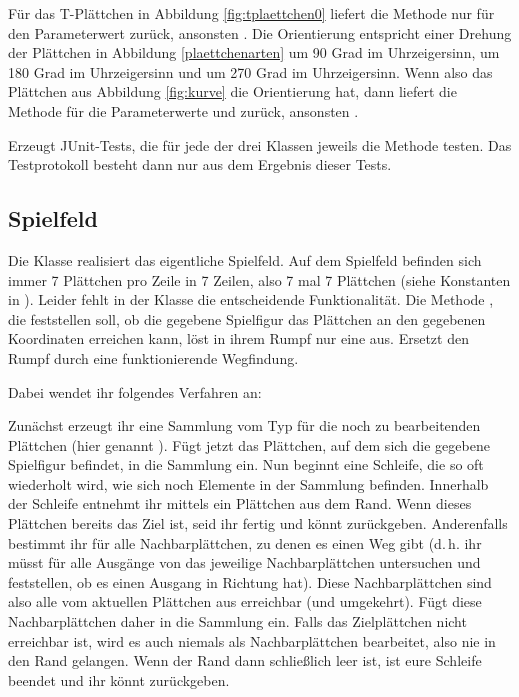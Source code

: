 \documentclass{pi-aufgabenblatt}
\newcommand{\dH}{\mbox{d.\,h.}\xspace}
\begin{document}
Für das T-Plättchen in Abbildung \ref{fig:tplaettchen0} liefert die Methode  
nur für den Parameterwert   zurück, ansonsten . Die Orientierung
 entspricht einer Drehung der Plättchen in Abbildung \ref{plaettchenarten} um 90 Grad im 
Uhrzeigersinn,  um 180 Grad im Uhrzeigersinn und  um 270 Grad im 
Uhrzeigersinn. Wenn also das Plättchen  aus Abbildung \ref{fig:kurve} die Orientierung  
hat, dann liefert die Methode  für die Parameterwerte   
und   zurück, ansonsten .

Erzeugt JUnit-Tests, die für jede der drei Klassen jeweils die Methode  testen. Das Testprotokoll 
besteht dann nur aus dem Ergebnis dieser Tests.

\subsection{Spielfeld }
Die Klasse  realisiert das eigentliche Spielfeld. Auf dem Spielfeld befinden sich immer 7 Plättchen pro Zeile in 7 Zeilen,
also 7 mal 7 Plättchen (siehe Konstanten in ). Leider fehlt in der Klasse die entscheidende Funktionalität.
Die Methode , die feststellen soll,
ob die gegebene Spielfigur das Plättchen an den gegebenen Koordinaten erreichen kann, löst in ihrem Rumpf nur eine 
 aus. Ersetzt den Rumpf durch eine funktionierende Wegfindung.

Dabei wendet ihr folgendes Verfahren an:

Zunächst erzeugt ihr eine Sammlung vom Typ  für die noch zu bearbeitenden Plättchen (hier genannt ). 
Fügt jetzt das Plättchen, auf dem sich die gegebene Spielfigur befindet, in die Sammlung  ein. Nun beginnt eine 
Schleife, die so oft wiederholt wird, wie sich noch Elemente in der Sammlung  befinden. Innerhalb der Schleife entnehmt ihr 
mittels  ein Plättchen  aus dem Rand.  Wenn dieses Plättchen bereits das Ziel ist, seid ihr fertig und könnt  zurückgeben.
Anderenfalls bestimmt ihr für  alle Nachbarplättchen, zu denen es einen Weg gibt (\dH ihr müsst für alle Ausgänge von  das jeweilige
Nachbarplättchen untersuchen und feststellen, ob es einen Ausgang in Richtung  hat). Diese Nachbarplättchen sind also alle vom aktuellen
Plättchen aus erreichbar (und umgekehrt). Fügt diese Nachbarplättchen daher in die Sammlung  ein. Falls das Zielplättchen nicht 
erreichbar ist, wird es auch niemals als Nachbarplättchen bearbeitet, also nie in den Rand gelangen.  Wenn der Rand dann schließlich leer ist, 
ist eure Schleife beendet und ihr könnt   zurückgeben.
\end{document}

